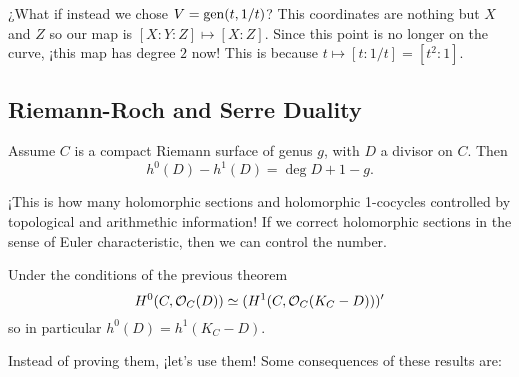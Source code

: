 \documentclass[12pt]{memoir}
\begin{document}
\begin{Ex}
    ¿What if instead we chose $V=\operatorname{gen}(t,1/t)$? This coordinates are nothing but $X$ and $Z$ so our map is $[X:Y:Z]\mapsto [X:Z]$. Since this point is no longer on the curve, ¡this map has degree $2$ now! This is because $t\mapsto [t:1/t]=[t^2:1]$.
    \begin{center}
    \end{center}
\end{Ex}

\subsection{Riemann-Roch and Serre Duality}

\begin{Th}
    Assume $C$ is a compact Riemann surface of genus $g$, with $D$ a divisor on $C$. Then 
    $$h^0(D)-h^1(D)=\deg D+1-g.$$
\end{Th}

¡This is how many holomorphic sections and holomorphic 1-cocycles controlled by topological and arithmethic information! If we correct holomorphic sections in the sense of Euler characteristic, then we can control the number.

\begin{Th}
    Under the conditions of the previous theorem
    $$H^0(C,\mathcal{O}_C(D))\simeq (H^1(C,\mathcal{O}_C(K_C-D)))'$$
    so in particular $h^0(D)=h^1(K_C-D)$.
\end{Th}

Instead of proving them, ¡let's use them! Some consequences of these results are:
\end{document}
